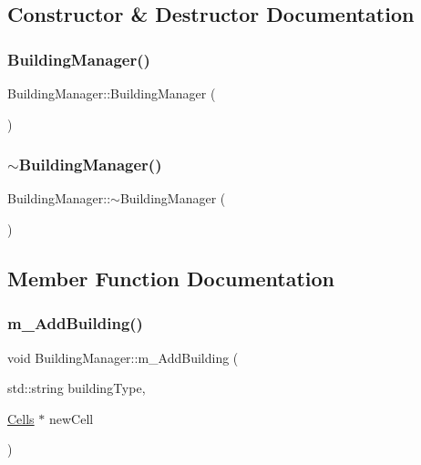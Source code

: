 \subsection{Constructor \& Destructor Documentation}
\mbox{\label{class_building_manager_ae393b30d59cd8c3f745ea9189f81cd44}} 
\subsubsection{\texorpdfstring{Building\+Manager()}{BuildingManager()}}
{\footnotesize\ttfamily Building\+Manager\+::\+Building\+Manager (\begin{DoxyParamCaption}{ }\end{DoxyParamCaption})}

\mbox{\label{class_building_manager_ae1018d56c81a769f15705b2f1b4da592}} 
\subsubsection{\texorpdfstring{$\sim$\+Building\+Manager()}{~BuildingManager()}}
{\footnotesize\ttfamily Building\+Manager\+::$\sim$\+Building\+Manager (\begin{DoxyParamCaption}{ }\end{DoxyParamCaption})}



\subsection{Member Function Documentation}
\mbox{\label{class_building_manager_a50acd47e63a6dad5930f95673d827749}} 
\subsubsection{\texorpdfstring{m\+\_\+\+Add\+Building()}{m\_AddBuilding()}}
{\footnotesize\ttfamily void Building\+Manager\+::m\+\_\+\+Add\+Building (\begin{DoxyParamCaption}\item[{std\+::string}]{building\+Type,  }\item[{\mbox{\hyperlink{class_cells}{Cells}} $\ast$}]{new\+Cell }\end{DoxyParamCaption})}

